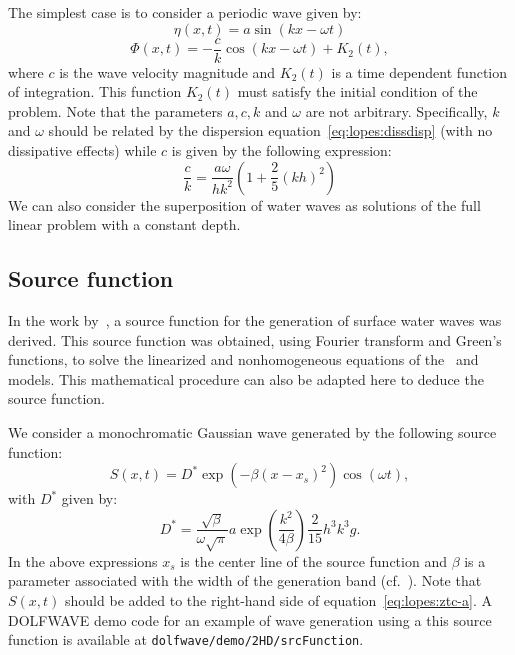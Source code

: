 The simplest case is to consider a periodic wave given by:
\begin{equation}\label{eq:lopes:dirichleteta}
\eta(x,t)=a \sin(kx-\omega t)
\end{equation}
\begin{equation}\label{eq:lopes:dirichletphi}
\Phi(x,t)=-\frac{c}{k}\cos(k x-\omega t)+K_2(t),
\end{equation}
where $c$ is the wave velocity magnitude and $K_2(t)$ is a
time dependent function of integration.  This function
$K_2(t)$ must satisfy the initial condition of the problem.
Note that the parameters $a,c,k$ and $\omega$ are not
arbitrary. Specifically, $k$ and $\omega$ should be related
by the dispersion equation~\eqref{eq:lopes:dissdisp} (with no
dissipative effects) while $c$ is given by the following
expression:
\begin{equation}
\frac{c}{k}=\frac{a\omega}{hk^2}\left(1+\frac{2}{5}(kh)^2\right)
\end{equation}
  We can also
consider the superposition of water waves as solutions of
the full linear problem with a constant depth.

\subsection{Source function}
In the work by~\cite{WeiKirbySinha1999}, a source
function for the generation of
surface water waves was derived.  This source function was
obtained, using Fourier transform and Green's functions, to
solve the linearized and nonhomogeneous equations of
the~\cite{Peregrine1967} and~\cite{Nwogu1993} models.  This
mathematical procedure can also be adapted here to deduce
the source function.

We consider a monochromatic Gaussian wave generated by the
following source function:
\begin{equation}\label{eq:lopes:src}
S(x,t)=D^* \exp(-\beta (x-x_s)^2)\cos(\omega t),
\end{equation}
with $D^*$ given by:
\begin{equation}
\displaystyle
D^*=\frac{\sqrt{\beta}}{\omega\sqrt{\pi}}a\exp(\frac{k^2}{4\beta})\frac{2}{15}h^3k^3g.
\end{equation}
In the above expressions $x_s$ is the center line of the
source function and $\beta$ is a parameter associated with
the width of the generation band
(cf.~\cite{WeiKirbySinha1999}).  Note that $S(x,t)$ should
be added to the right-hand side of
equation~\eqref{eq:lopes:ztc-a}.
A DOLFWAVE demo
code for an example of wave generation using a this source
function is  available at {\tt dolfwave/demo/2HD/srcFunction}.

